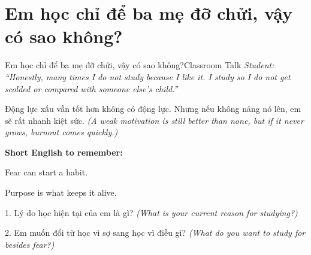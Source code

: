 \section{Em học chỉ để ba mẹ đỡ chửi, vậy có sao không?}
\begin{truyen}{Em học chỉ để ba mẹ đỡ chửi, vậy có sao không?}{Classroom Talk}
\textit{Student: ``Honestly, many times I do not study because I like it. I study so I do not get scolded or compared with someone else’s child.''}\\[4pt]



\end{truyen}

\begin{baihoc}
Động lực xấu vẫn tốt hơn không có động lực. Nhưng nếu không nâng nó lên, em sẽ rất nhanh kiệt sức.
\textit{(A weak motivation is still better than none, but if it never grows, burnout comes quickly.)}
\end{baihoc}

\begin{ghinhoanh}
\textbf{Short English to remember:}

Fear can start a habit.

Purpose is what keeps it alive.
\end{ghinhoanh}

\begin{tuhocnhanh}
1. Lý do học hiện tại của em là gì? \textit{(What is your current reason for studying?)}

2. Em muốn đổi từ học vì sợ sang học vì điều gì? \textit{(What do you want to study for besides fear?)}
\end{tuhocnhanh}
\ngancach